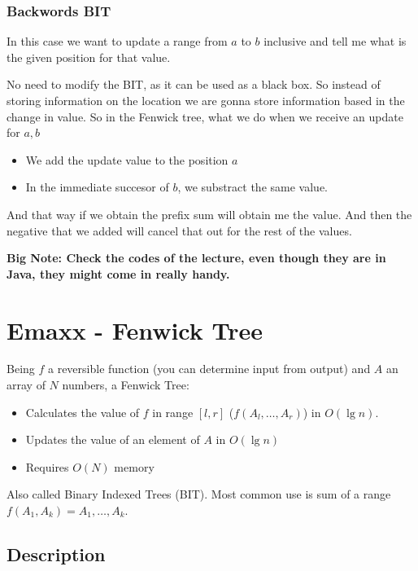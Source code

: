 \documentclass{IEEEtran}
\begin{document}
      \subsubsection{Backwords BIT}
        In this case we want to update a range from $a$ to $b$ inclusive and tell me what is the given position for that value.\par
        No need to modify the BIT, as it can be used as a black box. So instead of storing information on the location we are gonna store information based in the change in value. So in the Fenwick tree, what we do when we receive an update for $a,b$
        \begin{itemize}
          \item We add the update value to the position $a$
          \item In the immediate succesor of $b$, we substract the same value.
        \end{itemize}
        \par And that way if we obtain the prefix sum will obtain me the value. And then the negative that we added will cancel that out for the rest of the values.\par
        \textbf{Big Note: Check the codes of the lecture, even though they are in Java, they might come in really handy.}
  \section{Emaxx - Fenwick Tree}
    Being $f$ a reversible function (you can determine input from output) and $A$ an array of $N$ numbers, a Fenwick Tree:
    \begin{itemize}
      \item Calculates the value of $f$ in range $[l,r]$ ($f(A_l,\ldots,A_r)$) in $O(\lg{n})$.
      \item Updates the value of an element of $A$ in $O(\lg{n})$
      \item Requires $O(N)$ memory
    \end{itemize}
    \par Also called Binary Indexed Trees (BIT). Most common use is sum of a range $f(A_1,A_k)=A_1,\ldots,A_k$.
    \subsection{Description}
\end{document}
